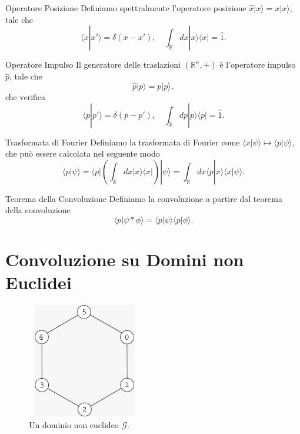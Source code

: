 \documentclass[xcolor=dvipsnames]{beamer}
\newcommand{\R}{\mathbb{R}}
\newcommand{\mc}[1]{\mathcal{#1}}
\begin{document}
\begin{frame}
    \begin{block}{Operatore Posizione}
        Definiamo spettralmente l'operatore posizione $\widehat{x}|x\rangle = x | x \rangle$, tale che
        \[ \langle x | x' \rangle = \delta(x-x'), \quad
    \int_{\R} dx | x \rangle \langle x | = \widehat{1} .\]
    \end{block}
    \begin{block}{Operatore Impulso}
    Il generatore delle traslazioni $(\R^n,+)$ è l'operatore impulso $\widehat{p}$, tale che
    \[ \widehat{p} | p \rangle = p | p \rangle, \]
    che verifica
    \[ \langle p | p' \rangle = \delta(p-p'), \quad
    \int_{\R} dp | p \rangle \langle p | = \widehat{1} .\]
    \end{block}
\end{frame}

\begin{frame}
    \begin{block}{Trasformata di Fourier}
        Definiamo la trasformata di Fourier come $\langle x | \psi \rangle \mapsto \langle p | \psi \rangle$, 
        che può essere calcolata nel seguente modo
        \[ \langle p | \psi \rangle = \langle p | \left( \int_{\R} dx | x \rangle \langle x| \right) | \psi \rangle = 
         \int_{\R} dx \langle p | x \rangle \langle x | \psi \rangle. \]
    \end{block}
    \begin{block}{Teorema della Convoluzione}
        Definiamo la convoluzione a partire dal teorema della convoluzione
        \[ \langle p | \psi * \phi \rangle = \langle p | \psi \rangle \langle p | \phi \rangle . \]
    \end{block}
\end{frame}

\section{Convoluzione su Domini \textbf{non} Euclidei}

\begin{frame}
    \begin{figure}[H]
        \centering
        \includegraphics[width=5cm, height=5cm]{graph}
        \caption{Un dominio non euclideo $\mc{G}$.}
    \end{figure}    
\end{frame}
\end{document}
